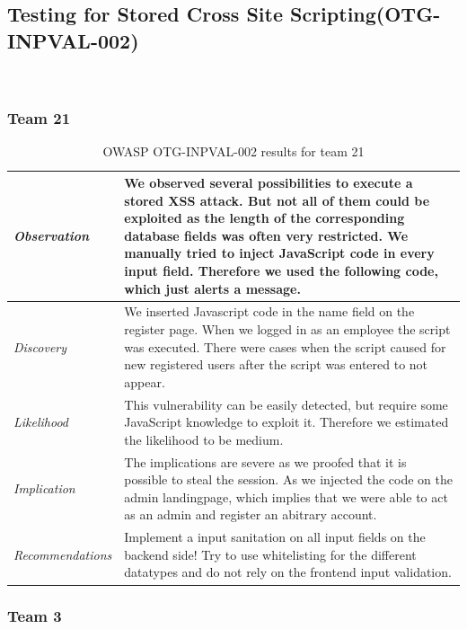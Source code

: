 \documentclass[headsepline,footsepline,footinclude=false,oneside,fontsize=11pt,paper=a4,listof=totoc,bibliography=totoc]{scrbook} %
\begin{document}
\pagebreak 
\subsection{Testing for Stored Cross Site Scripting(OTG-INPVAL-002)}\

\subsubsection{Team 21}

\begin{table}[H]
	\centering
	\begin{tabular}{l p{11cm}} 
		\textit{Observation} & We observed several possibilities to execute a stored XSS attack. But not all of
		them could be exploited as the length of the corresponding database fields was
		often very restricted.
		We manually tried to inject JavaScript code in every input field. Therefore we
		used the following code, which just alerts a message. \\ 
		\hline
		\textit{Discovery} &   We inserted Javascript code in the name field on the register page.
		When we logged in as an employee the script was executed.  There were cases when the script caused for new registered users after the script was entered to not appear. \\
		\hline
		\textit{Likelihood} & This vulnerability can be easily detected, but require some JavaScript knowledge to exploit it. Therefore we estimated the likelihood to be medium.\\
		\hline
		\textit{Implication} & The implications are severe as we proofed that it is possible to steal the session. As we injected the code on the admin landingpage, which implies that we were able to act as an admin and register an abitrary account.\\
		\hline
		\textit{Recommendations} &Implement a input sanitation on all input fields on the backend side!  Try to use whitelisting for the different datatypes and do not rely on the frontend input
		validation.\\ 
	\end{tabular}
	\caption{OWASP OTG-INPVAL-002 results for team 21}
	\label{table:scenario2}
\end{table}

\subsubsection{Team 3}
\end{document}
